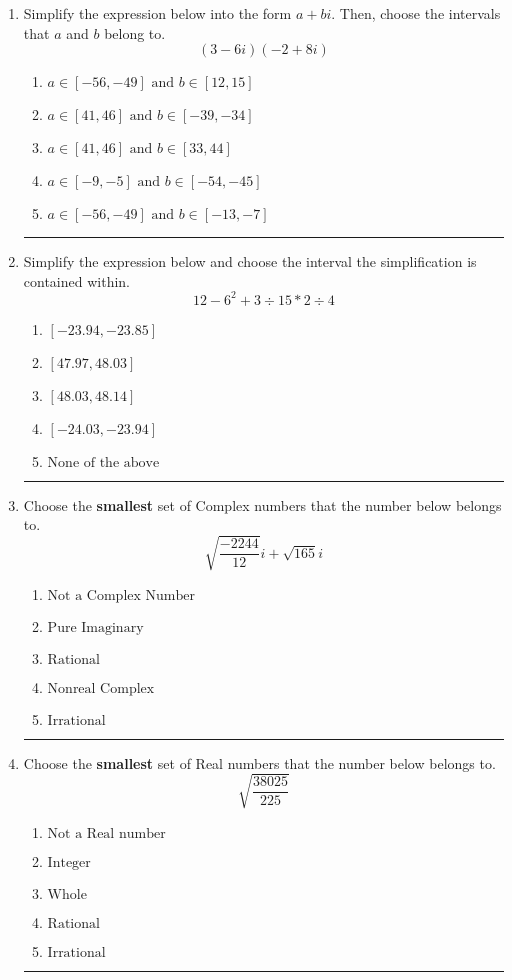 \documentclass[14pt]{extbook}
\newcommand{\litem}[1]{\item#1\hspace*{-1cm}\rule{\textwidth}{0.4pt}}
\begin{document}
\begin{enumerate}
\litem{
Simplify the expression below into the form $a+bi$. Then, choose the intervals that $a$ and $b$ belong to.\[ (3 - 6 i)(-2 + 8 i) \]\begin{enumerate}[label=\Alph*.]
\item \( a \in [-56, -49] \text{ and } b \in [12, 15] \)
\item \( a \in [41, 46] \text{ and } b \in [-39, -34] \)
\item \( a \in [41, 46] \text{ and } b \in [33, 44] \)
\item \( a \in [-9, -5] \text{ and } b \in [-54, -45] \)
\item \( a \in [-56, -49] \text{ and } b \in [-13, -7] \)

\end{enumerate} }
\litem{
Simplify the expression below and choose the interval the simplification is contained within.\[ 12 - 6^2 + 3 \div 15 * 2 \div 4 \]\begin{enumerate}[label=\Alph*.]
\item \( [-23.94, -23.85] \)
\item \( [47.97, 48.03] \)
\item \( [48.03, 48.14] \)
\item \( [-24.03, -23.94] \)
\item \( \text{None of the above} \)

\end{enumerate} }
\litem{
Choose the \textbf{smallest} set of Complex numbers that the number below belongs to.\[ \sqrt{\frac{-2244}{12}} i+\sqrt{165}i \]\begin{enumerate}[label=\Alph*.]
\item \( \text{Not a Complex Number} \)
\item \( \text{Pure Imaginary} \)
\item \( \text{Rational} \)
\item \( \text{Nonreal Complex} \)
\item \( \text{Irrational} \)

\end{enumerate} }
\litem{
Choose the \textbf{smallest} set of Real numbers that the number below belongs to.\[ \sqrt{\frac{38025}{225}} \]\begin{enumerate}[label=\Alph*.]
\item \( \text{Not a Real number} \)
\item \( \text{Integer} \)
\item \( \text{Whole} \)
\item \( \text{Rational} \)
\item \( \text{Irrational} \)


\end{enumerate}}
\end{enumerate}
\end{document}
